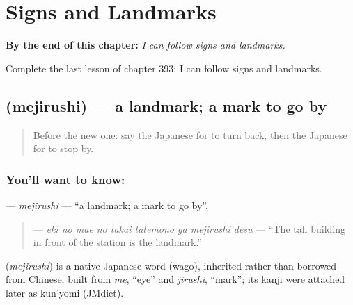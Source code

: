 
\chapter{Signs and Landmarks}
\label{ch:ja-signs-and-landmarks}

\begin{chapteropening}
\textbf{By the end of this chapter:} \emph{I can follow signs and landmarks.}

Complete the last lesson of chapter 393: I can follow signs and landmarks.
\end{chapteropening}

\section[\texorpdfstring{\ja{めじるし} (mejirushi)}{めじるし (mejirushi)}]{ (mejirushi) — a landmark; a mark to go by}

\label{lesson:JA-C393-mejirushi}



\begin{quote}
Before the new one: say the Japanese for to turn back, then the Japanese for to stop by.
\end{quote}

\subsection*{You'll want to know: }
\textbf{} — \emph{mejirushi} — \textquotedblleft{}a landmark; a mark to go by\textquotedblright{}.

\begin{quote}
\textbf{    } — \emph{eki no mae no takai tatemono ga mejirushi desu} — \textquotedblleft{}The tall building in front of the station is the landmark.\textquotedblright{}
\end{quote}

\begin{cousinweb}
\textbf{} (\emph{mejirushi}) is a native Japanese word (wago), inherited rather than borrowed from Chinese, built from \emph{me}, \textquotedblleft{}eye\textquotedblright{} and \emph{jirushi}, \textquotedblleft{}mark\textquotedblright{}; its kanji were attached later as kun'yomi (JMdict).
\end{cousinweb}

